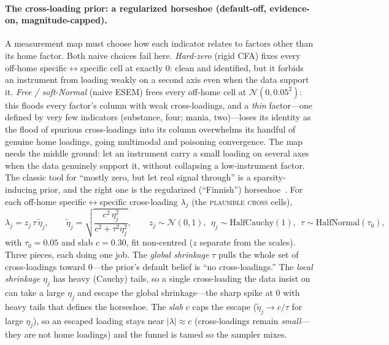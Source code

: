 \paragraph{The cross-loading prior: a regularized horseshoe (default-off, evidence-on,
magnitude-capped).} A measurement map must choose how each indicator relates to factors
other than its home factor. Both naive choices fail here. \emph{Hard-zero} (rigid CFA)
fixes every off-home specific$\leftrightarrow$specific cell at exactly $0$: clean and
identified, but it forbids an instrument from loading weakly on a second axis even when
the data support it. \emph{Free / soft-Normal} (naive ESEM) frees every off-home cell at
$\mathcal N(0,0.05^2)$: this floods every factor's column with weak cross-loadings, and a
\emph{thin} factor---one defined by very few indicators (substance, four; mania,
two)---loses its identity as the flood of spurious cross-loadings into its column
overwhelms its handful of genuine home loadings, going multimodal and poisoning
convergence. The map needs the middle ground: let an instrument carry a small loading on
several axes when the data genuinely support it, without collapsing a low-instrument
factor. The classic tool for ``mostly zero, but let real signal through'' is a
sparsity-inducing prior, and the right one is the regularized (``Finnish'')
horseshoe~\citep{carvalho2009horseshoe,piironen2017horseshoe}. For each off-home
specific$\leftrightarrow$specific cross-loading $\lambda_j$ (the \textsc{plausible cross}
cells),
\begin{equation}
  \lambda_j=z_j\,\tau\,\tilde\eta_j,\qquad
  \tilde\eta_j=\sqrt{\dfrac{c^2\,\eta_j^2}{c^2+\tau^2\eta_j^2}},\qquad
  z_j\sim\mathcal N(0,1),\ \ \eta_j\sim\mathrm{HalfCauchy}(1),\ \ \tau\sim\mathrm{HalfNormal}(\tau_0),
  \label{eqA:horseshoe}
\end{equation}
with $\tau_0=0.05$ and slab $c=0.30$, fit non-centred ($z$ separate from the scales).
Three pieces, each doing one job. The \emph{global shrinkage} $\tau$ pulls the whole set
of cross-loadings toward $0$---the prior's default belief is ``no cross-loadings.'' The
\emph{local shrinkage} $\eta_j$ has heavy (Cauchy) tails, so a single cross-loading the
data insist on can take a large $\eta_j$ and escape the global shrinkage---the sharp
spike at $0$ with heavy tails that defines the horseshoe. The \emph{slab} $c$ caps the
escape ($\tilde\eta_j\to c/\tau$ for large $\eta_j$), so an escaped loading stays near
$|\lambda|\approx c$ (cross-loadings remain \emph{small}---they are not home loadings)
and the funnel is tamed so the sampler mixes.


